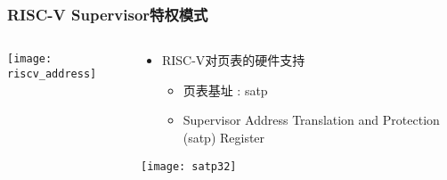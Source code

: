 \begin{frame}   
	\frametitle{RISC-V Supervisor特权模式}
	
	\begin{columns}[t]
		
		\begin{column}{.5\textwidth}
			
			\texttt{[image: riscv\_address]}
			
		\end{column}
		
		
		\begin{column}{.5\textwidth}
			
			\begin{itemize}\large
				\item RISC-V对页表的硬件支持
				\begin{itemize}
					\item 页表基址 \pause : satp
					\item  Supervisor Address Translation and Protection (satp) Register
					
							
				\end{itemize}
			\end{itemize}
			
			\texttt{[image: satp32]}
			
		\end{column}
		
		
	\end{columns}
	
\end{frame}


